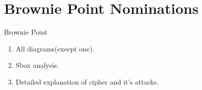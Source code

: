 \section{Brownie Point Nominations}

\begin{frame}{Brownie Point}
\begin{enumerate}
    \item All diagrams(except one). 
    \item Sbox analysis.
    \item Detailed explanation of cipher and it's attacks.
\end{enumerate}


\end{frame}

